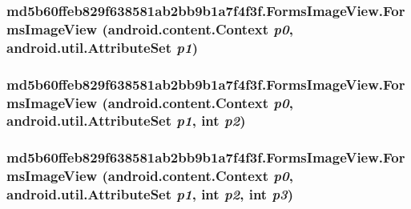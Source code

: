 \hypertarget{classmd5b60ffeb829f638581ab2bb9b1a7f4f3f_1_1_forms_image_view_8ba0beff3d66206db1bb62532722d902}{
\subsubsection[{FormsImageView}]{\setlength{\rightskip}{0pt plus 5cm}md5b60ffeb829f638581ab2bb9b1a7f4f3f.FormsImageView.FormsImageView (android.content.Context {\em p0}, \/  android.util.AttributeSet {\em p1})}}
\label{classmd5b60ffeb829f638581ab2bb9b1a7f4f3f_1_1_forms_image_view_8ba0beff3d66206db1bb62532722d902}


\hypertarget{classmd5b60ffeb829f638581ab2bb9b1a7f4f3f_1_1_forms_image_view_65c516e6939a16b2841dc673bd36a971}{
\subsubsection[{FormsImageView}]{\setlength{\rightskip}{0pt plus 5cm}md5b60ffeb829f638581ab2bb9b1a7f4f3f.FormsImageView.FormsImageView (android.content.Context {\em p0}, \/  android.util.AttributeSet {\em p1}, \/  int {\em p2})}}
\label{classmd5b60ffeb829f638581ab2bb9b1a7f4f3f_1_1_forms_image_view_65c516e6939a16b2841dc673bd36a971}


\hypertarget{classmd5b60ffeb829f638581ab2bb9b1a7f4f3f_1_1_forms_image_view_c4e4d979e4813af986f532bf966d2c41}{
\subsubsection[{FormsImageView}]{\setlength{\rightskip}{0pt plus 5cm}md5b60ffeb829f638581ab2bb9b1a7f4f3f.FormsImageView.FormsImageView (android.content.Context {\em p0}, \/  android.util.AttributeSet {\em p1}, \/  int {\em p2}, \/  int {\em p3})}}
\label{classmd5b60ffeb829f638581ab2bb9b1a7f4f3f_1_1_forms_image_view_c4e4d979e4813af986f532bf966d2c41}





